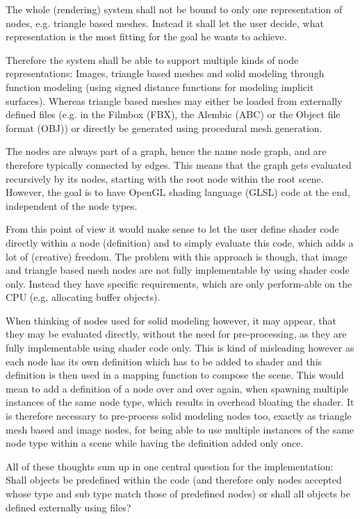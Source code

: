 \documentclass[10pt, openright, notitlepage]{scrreprt}
\begin{document}
The whole (rendering) system shall not be bound to only one representation of
nodes, e.g. triangle based meshes. Instead it shall let the user decide, what
representation is the most fitting for the goal he wants to achieve.

Therefore the system shall be able to support multiple kinds of node
representations: Images, triangle based meshes and solid modeling through
function modeling (using signed distance functions for modeling implicit
surfaces). Whereas triangle based meshes may either be loaded from externally
defined files (e.g. in the Filmbox (FBX), the Alembic (ABC) or the Object file
format (OBJ)) or directly be generated using procedural mesh generation.

The nodes are always part of a graph, hence the name node graph, and are
therefore typically connected by edges. This means that the graph gets evaluated
recursively by its nodes, starting with the root node within the root scene.
However, the goal is to have OpenGL shading language (GLSL) code at the end, independent of the node types.

From this point of view it would make sense to let the user define shader
code directly within a node (definition) and to simply evaluate this code, which
adds a lot of (creative) freedom. The problem with this approach is though, that
image and triangle based mesh nodes are not fully implementable by using shader
code only. Instead they have specific requirements, which are only perform-able
on the CPU (e.g. allocating buffer objects).

When thinking of nodes used for solid modeling however, it may appear, that they
may be evaluated directly, without the need for pre-processing, as they are
fully implementable using shader code only. This is kind of misleading however
as each node has its own definition which has to be added to shader and this
definition is then used in a mapping function to compose the scene. This would
mean to add a definition of a node over and over again, when spawning multiple
instances of the same node type, which results in overhead bloating the shader.
It is therefore necessary to pre-process solid modeling nodes too, exactly as
triangle mesh based and image nodes, for being able to use multiple instances of
the same node type within a scene while having the definition added only once.

All of these thoughts sum up in one central question for the implementation:
Shall objects be predefined within the code (and therefore only nodes accepted
whose type and sub type match those of predefined nodes) or shall all objects be
defined externally using files?
\end{document}
